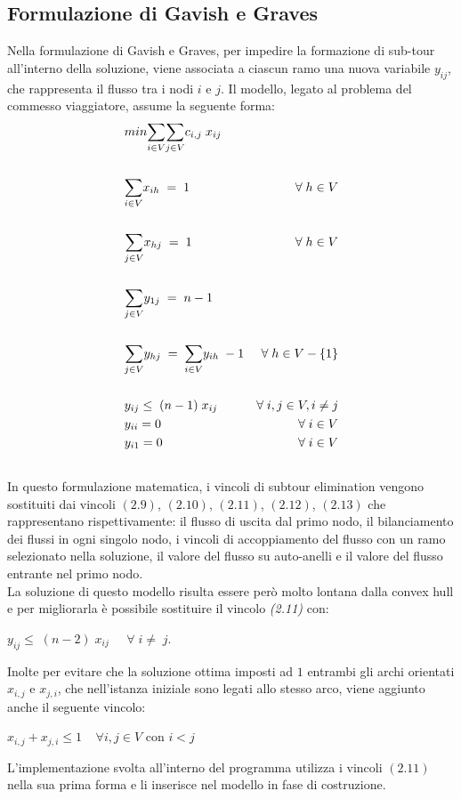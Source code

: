 \subsection{Formulazione di Gavish e Graves}
Nella formulazione di Gavish e Graves, per impedire la formazione di sub-tour all'interno della soluzione, viene associata a ciascun ramo una nuova variabile $y_{ij}$, che rappresenta il flusso tra i nodi $i$ e $j$. Il modello, legato al problema del commesso viaggiatore, assume la seguente forma:
\begin{align}
& min\underset{i\in V}\sum{\underset{j\in V}\sum{c_{i,j}\; x_{ij}}} \\ \notag \\
& \underset{i\in V}\sum{x_{ih}}\;=\;1 & \forall\;h\in V \\ \notag\\
& \underset{j\in V}\sum{x_{hj}}\;=\;1 & \forall\;h\in V \\ \notag\\
& \underset{j\in V}\sum{y_{1j}}\;=\;n-1\\ \notag\\
& \underset{j\in V}\sum{y_{hj}}\;=\;\underset{i\in V}\sum{y_{ih}}\;-1 & \forall\;h\in V-\{1\}\\ \notag\\
& y_{ij}\leq\;(n-1)\;x_{ij} & \forall\;i,j\in V, i\neq j\\ \notag
& y_{ii}=0 & \forall\;i\in V\\\notag
& y_{i1}=0 & \forall\;i\in V\\\notag
\end{align}
In questo formulazione matematica, i vincoli di subtour elimination vengono sostituiti dai vincoli $(2.9)$, $(2.10)$, $(2.11)$, $(2.12)$, $(2.13)$ che rappresentano rispettivamente: il flusso di uscita dal primo nodo, il bilanciamento dei flussi in ogni singolo nodo, i vincoli di accoppiamento del flusso con un ramo selezionato nella soluzione, il valore del flusso su auto-anelli e il valore del flusso entrante nel primo nodo.\\
La soluzione di questo modello risulta essere però molto lontana dalla convex hull e per migliorarla è possibile sostituire il vincolo \textit{(2.11)} con: \\
\begin{center}
$y_{ij}\leq\;(n-2)\;x_{ij} \;\;\;\;\;\forall\; i\neq \; j$.\\
\end{center} 
Inolte per evitare che la soluzione ottima imposti ad $1$ entrambi gli archi orientati $x_{i,j}$ e $x_{j,i}$, che nell'istanza iniziale sono legati allo stesso arco, viene aggiunto anche il seguente vincolo:
\begin{center}
$x_{i,j}+x_{j,i}\leq 1\;\;\;\; \forall i,j \in V$ con $i < j$
\end{center}
L'implementazione svolta all'interno del programma utilizza i vincoli $(2.11)$ nella sua prima forma e li inserisce nel modello in fase di costruzione.

